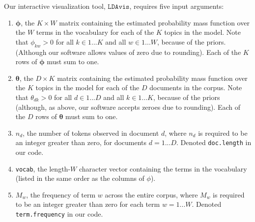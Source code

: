 \documentclass[12pt]{article}
\begin{document}
Our interactive visualization tool, $\texttt{LDAvis}$, requires five input arguments:
\begin{enumerate}
\item $\boldsymbol\phi$, the $K \times W$ matrix containing the estimated probability mass function over the $W$ terms in the vocabulary for each of the $K$ topics in the model. Note that $\phi_{kw} > 0$ for all $k \in 1...K$ and all $w \in 1...W$, because of the priors. (Although our software allows values of zero due to rounding). Each of the $K$ rows of $\boldsymbol\phi$ must sum to one.
\item $\boldsymbol\theta$, the $D \times K$ matrix containing the estimated probability mass function over the $K$ topics in the model for each of the $D$ documents in the corpus. Note that $\theta_{dk} > 0$ for all $d \in 1...D$ and all $k \in 1...K$, because of the priors (although, as above, our software accepts zeroes due to rounding). Each of the $D$ rows of $\boldsymbol\theta$ must sum to one.
\item $n_d$, the number of tokens observed in document $d$, where $n_d$ is required to be an integer greater than zero, for documents $d = 1...D$. Denoted \texttt{doc.length} in our code.
\item \texttt{vocab}, the length-$W$ character vector containing the terms in the vocabulary (listed in the same order as the columns of $\phi$).
\item $M_w$, the frequency of term $w$ across the entire corpus, where $M_w$ is required to be an integer greater than zero for each term $w=1...W$. Denoted \texttt{term.frequency} in our code.
\end{enumerate}
\end{document}
